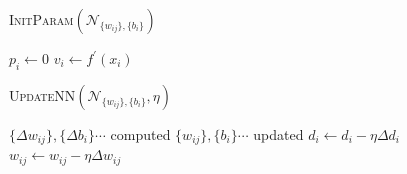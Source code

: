 \documentclass{article}
\begin{document}
\begin{algorithm}
\caption{\textsc{InitParam}$(\mathcal{N}_{\{w_{ij}\},\{b_{i}\}})$}
\begin{algorithmic}[1]
  \State $p_{i}\leftarrow 0$
  \State $v_{i}\leftarrow f^{\prime}(x_{i})$
\EndFor
\end{algorithmic}
\end{algorithm}

\begin{algorithm}
\caption{\textsc{UpdateNN}$(\mathcal{N}_{\{w_{ij}\},\{b_{i}\}},\eta)$}
\begin{algorithmic}[1]
\Require $\{\varDelta w_{ij}\},\{\varDelta b_{i}\} \cdots$ computed
\Ensure $\{w_{ij}\},\{b_{i}\} \cdots$ updated
  \State $d_{i}\leftarrow d_{i}-\eta\varDelta d_{i}$
    \State $w_{ij}\leftarrow w_{ij}-\eta\varDelta w_{ij}$
  \EndFor
\EndFor
\end{algorithmic}
\end{algorithm}
\end{document}
